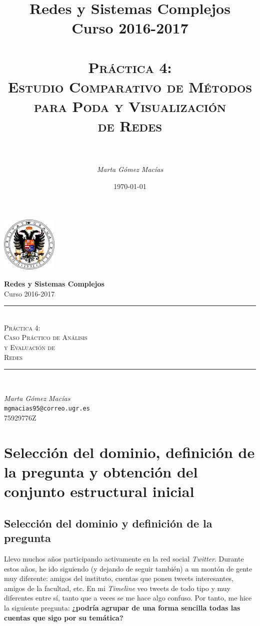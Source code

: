 \documentclass[10pt,a4paper,spanish]{article}
\title{
\normalfont \normalsize 
{\bf Redes y Sistemas Complejos} \\ Curso 2016-2017 \\ [25pt] %
\horrule{0.5pt} \\[0.4cm] %
\huge \textsc{Práctica 4: \\ Estudio Comparativo de Métodos \\ para Poda y Visualización \\ de Redes } \\ %
\horrule{2pt} \\[0.5cm] %
}
\author{\textit{Marta Gómez Macías}} %
\numberwithin{equation}{section} %
\numberwithin{figure}{section} %
\numberwithin{table}{section} %
\newcommand{\horrule}[1]{\rule{\linewidth}{#1}} %
\begin{document}
\renewcommand{\listtablename}{Índice de tablas}
\renewcommand{\tablename}{Tabla} 

\begin{titlepage}
\begin{center}
\includegraphics[width=0.2\textwidth]{../../ugr}

\normalfont \normalsize 
{\bf Redes y Sistemas Complejos} \\ Curso 2016-2017 \\ [25pt] %
\horrule{0.5pt} \\[0.4cm] %
{\huge \textsc{Práctica 4: \\ Caso Práctico de Análisis \\ y Evaluación de \\ Redes}} %
\horrule{2pt} \\[0.5cm] %

{\Large \textit{Marta Gómez Macías} \\ \texttt{mgmacias95@correo.ugr.es} \\ 75929776Z \\[0.5cm]

\date{\today}} %
\end{center}
\end{titlepage}

\tableofcontents %

\newpage



\section{Selección del dominio, definición de la pregunta y obtención del conjunto estructural inicial}

\subsection{Selección del dominio y definición de la pregunta}
Llevo muchos años participando activamente en la red social \textit{Twitter}. Durante estos años, he ido siguiendo (y dejando de seguir también) a un montón de gente muy diferente: amigos del instituto, cuentas que ponen tweets interesantes, amigos de la facultad, etc. En mi \textit{Timeline} veo tweets de todo tipo y muy diferentes entre sí, tanto que a veces se me hace algo confuso. Por tanto, me hice la siguiente pregunta: \textbf{¿podría agrupar de una forma sencilla todas las cuentas que sigo por su temática?}
\end{document}
